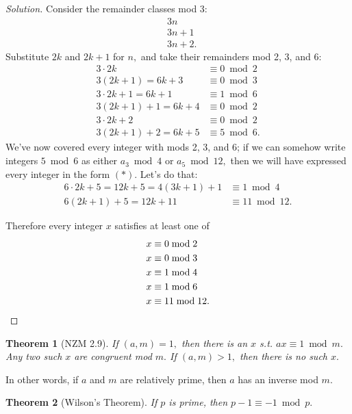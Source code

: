 \documentclass[20pt]{extarticle}
\theoremstyle{plain}
\newtheorem{theorem}{Theorem}
\theoremstyle{definition}
\theoremstyle{remark}
\newenvironment{solution}{\begin{proof}[Solution]}{\end{proof}}
\newcommand{\0}{\varnothing}
\newcommand{\<}{\langle}
\renewcommand{\>}{\rangle}
\begin{document}
\begin{solution}
Consider the remainder classes mod 3: \begin{align*}
  & 3 n \\
  & 3 n + 1 \\
  & 3 n + 2.
\end{align*}
Substitute $ 2k $ and $ 2k + 1 $ for $ n, $ and take their remainders mod 2, 3, and 6: \begin{align*}
3 \cdot 2 k &\equiv 0 \bmod 2 \\
3 (2k + 1) = 6k + 3 &\equiv 0 \bmod 3 \\
3 \cdot 2k + 1 = 6k + 1 &\equiv 1 \bmod 6 \\
3 (2k + 1) + 1 = 6k + 4 &\equiv 0 \bmod 2 \\
3 \cdot 2k + 2 &\equiv 0 \bmod 2 \\
3 (2k + 1) + 2 = 6k + 5 &\equiv 5 \bmod 6.
\end{align*}
We've now covered every integer with mods 2, 3, and 6; if we can somehow write integers $ 5 \bmod 6 $ as either $ a_3 \bmod 4 $ or $ a_5 \bmod 12, $ then we will have expressed every integer in the form $(*).$ Let's do that: \begin{align*}
6 \cdot 2k + 5 = 12k + 5 = 4(3k + 1) + 1 &\equiv 1 \bmod 4 \\
6(2k + 1) + 5 = 12k + 11 &\equiv 11 \bmod 12.
\end{align*}

Therefore every integer $ x $ satisfies at least one of
\begin{align*}
  x &\equiv 0 \bmod 2 \\
  x &\equiv 0 \bmod 3 \\
  x &\equiv 1 \bmod 4 \\
  x &\equiv 1 \bmod 6 \\
  x &\equiv 11 \bmod 12. \qedhere
\end{align*}
\end{solution}

\begin{theorem}[NZM 2.9]
If $ (a, m) = 1, $ then there is an $ x $ s.t. $ ax \equiv 1 \bmod m. $ Any two such $ x $ are congruent mod $ m. $ If $ (a, m) > 1,$ then there is no such $ x. $
\end{theorem}

In other words, if $ a $ and $ m $ are relatively prime, then $ a $ has an inverse mod $ m. $

\begin{theorem}[Wilson's Theorem]
If $ p $ is prime, then $ p - 1 \equiv -1 \bmod p. $
\end{theorem}
\end{document}
